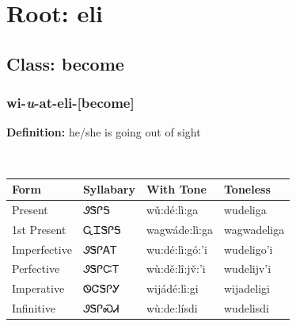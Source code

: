 \needspace{4in}
\section*{Root: eli}
\nopagebreak
{}
\needspace{3in}
\subsection*{Class: become}
\nopagebreak
\needspace{2in}
\subsubsection*{wi{-}\textit{u}{-}at{-}\textbf{eli}{-}[become]}
\nopagebreak
\textbf{Definition: } he/she is going out of sight
\\[0.5em]
\begin{tabularx}{\textwidth}{l X X X}%
\toprule%
\textbf{Form}&\textbf{Syllabary}&\textbf{With Tone}&\textbf{Toneless}\\%
\midrule%
Present&ᏭᏕᎵᎦ&wǔ:dé:lì:ga&wudeliga\\%
1st Present&ᏩᏆᏕᎵᎦ&wagwáde:lì:ga&wagwadeliga\\%
Imperfective&ᏭᏕᎵᎪᎢ&wu:dé:lì:gó:’i&wudeligo’i\\%
Perfective&ᏭᏕᎵᏨᎢ&wù:dě:lî:jv̌:’i&wudelijv’i\\%
Imperative&ᏫᏣᏕᎵᎩ&wijádé:lì:gi&wijadeligi\\%
Infinitive&ᏭᏕᎵᏍᏗ&wù:de:lísdi&wudelisdi\\%
\bottomrule%
\end{tabularx}
\\[1em]